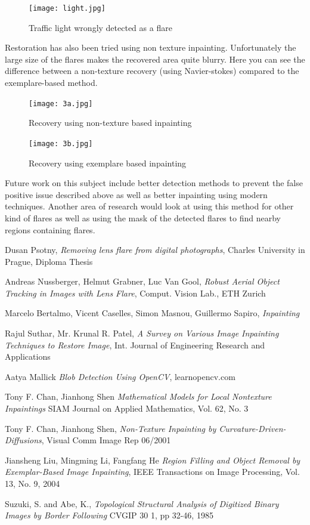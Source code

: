 \documentclass[11pt,twocolumn]{article}
\begin{document}
\begin{figure}[ht!]
\centering
\texttt{[image: light.jpg]}
\caption{Traffic light wrongly detected as a flare}
\end{figure}

Restoration has also been tried using non texture inpainting. Unfortunately the large size of the flares makes the recovered area quite blurry. Here you can see the difference between a non-texture recovery (using Navier-stokes) compared to the exemplare-based method.
\\

\begin{figure}[ht!]
\centering
\texttt{[image: 3a.jpg]}
\caption{Recovery using non-texture based inpainting}
\end{figure}

\begin{figure}[ht!]
\centering
\texttt{[image: 3b.jpg]}
\caption{Recovery using exemplare based inpainting}
\end{figure}

Future work on this subject include better detection methods to prevent the false positive issue described above as well as better inpainting using modern techniques.
Another area of research would look at using this method for other kind of flares as well as using the mask of the detected flares to find nearby regions containing flares.

\begin{thebibliography}{1}

\bibitem
Dusan Psotny,
\emph{Removing lens flare from digital photographs},
Charles University in Prague, Diploma Thesis

\bibitem
Andreas Nussberger, Helmut Grabner, Luc Van Gool,
\emph{Robust Aerial Object Tracking in Images with Lens Flare},
Comput. Vision Lab., ETH Zurich

\bibitem
Marcelo Bertalmo, Vicent Caselles, Simon Masnou, Guillermo Sapiro,
\emph{Inpainting}

\bibitem
Rajul Suthar, Mr. Krunal R. Patel,
\emph{A Survey on Various Image Inpainting Techniques to Restore Image},
Int. Journal of Engineering Research and Applications

\bibitem
Aatya Mallick
\emph{Blob Detection Using OpenCV},
learnopencv.com

\bibitem
Tony F. Chan, Jianhong Shen
\emph{Mathematical Models for Local Nontexture Inpaintings}
SIAM Journal on Applied Mathematics, Vol. 62, No. 3

\bibitem
Tony F. Chan, Jianhong Shen,
\emph{Non-Texture Inpainting by Curvature-Driven-Diffusions},
Visual Comm Image Rep 06/2001

\bibitem
Jiansheng Liu, Mingming Li, Fangfang He
\emph{Region Filling and Object Removal by Exemplar-Based Image Inpainting},
IEEE Transactions on Image Processing, Vol. 13, No. 9, 2004

\bibitem
Suzuki, S. and Abe, K., 
\emph{Topological Structural Analysis of Digitized Binary Images by Border Following}
CVGIP 30 1, pp 32-46, 1985

\end{thebibliography}
\end{document}
